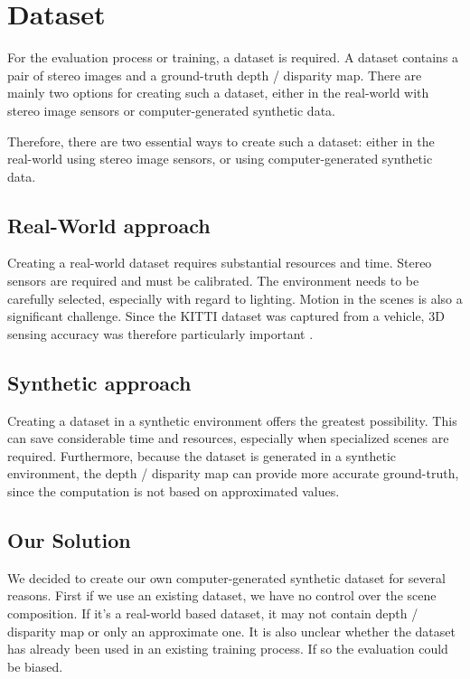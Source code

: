 
\section{Dataset}\label{dataset}
For the evaluation process or training, a dataset is required. A dataset contains a pair of stereo images and a ground-truth depth / disparity map. There are mainly two options for creating such a dataset, either in the real-world with stereo image sensors or computer-generated synthetic data.

Therefore, there are two essential ways to create such a dataset: either in the real-world using stereo image sensors, or using computer-generated synthetic data.

\subsection{Real-World approach}
Creating a real-world dataset requires substantial resources and time. Stereo sensors are required and must be calibrated. The environment needs to be carefully selected, especially with regard to lighting. Motion in the scenes is also a significant challenge. Since the KITTI dataset was captured from a vehicle, 3D sensing accuracy was therefore particularly important \citep{6248074}.

\subsection{Synthetic approach}
Creating a dataset in a synthetic environment offers the greatest possibility. This can save considerable time and resources, especially when specialized scenes are required. Furthermore, because the dataset is generated in a synthetic environment, the depth / disparity map can provide more accurate ground-truth, since the computation is not based on approximated values.

\subsection{Our Solution}\label{dataset-ours}
We decided to create our own computer-generated synthetic dataset for several reasons. First if we use an existing dataset, we have no control over the scene composition. If it's a real-world based dataset, it may not contain depth / disparity map or only an approximate one. It is also unclear whether the dataset has already been used in an existing training process. If so the evaluation could be biased.

